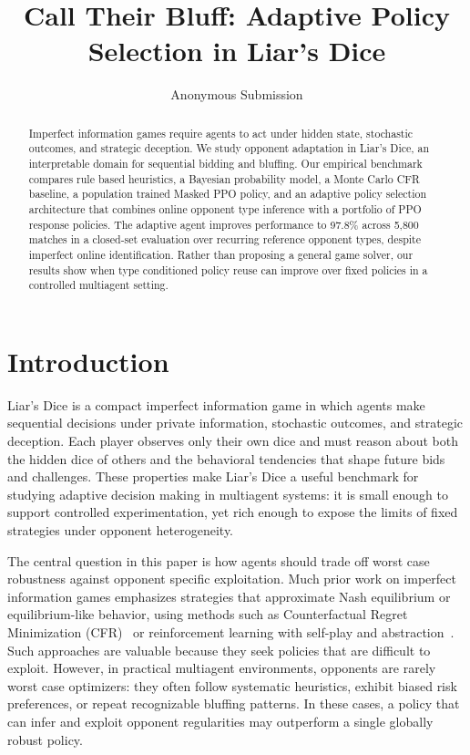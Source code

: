 \documentclass[letterpaper]{article} %
\title{Call Their Bluff: Adaptive Policy Selection in Liar’s Dice}
\author{Anonymous Submission}
\begin{document}
\maketitle



\begin{abstract}
Imperfect information games require agents to act under hidden state, stochastic outcomes, and strategic deception. We study opponent adaptation in Liar's Dice, an interpretable domain for sequential bidding and bluffing. Our empirical benchmark compares rule based heuristics, a Bayesian probability model, a Monte Carlo CFR baseline, a population trained Masked PPO policy, and an adaptive policy selection architecture that combines online opponent type inference with a portfolio of PPO response policies. The adaptive agent improves performance to 97.8\% across 5,800 matches in a closed-set evaluation over recurring reference opponent types, despite imperfect online identification. Rather than proposing a general game solver, our results show when type conditioned policy reuse can improve over fixed policies in a controlled multiagent setting.
\end{abstract}




\section{Introduction}

Liar’s Dice is a compact imperfect information game in which agents make sequential decisions under private information, stochastic outcomes, and strategic deception. Each player observes only their own dice and must reason about both the hidden dice of others and the behavioral tendencies that shape future bids and challenges. These properties make Liar’s Dice a useful benchmark for studying adaptive decision making in multiagent systems: it is small enough to support controlled experimentation, yet rich enough to expose the limits of fixed strategies under opponent heterogeneity.

The central question in this paper is how agents should trade off worst case robustness against opponent specific exploitation. Much prior work on imperfect information games emphasizes strategies that approximate Nash equilibrium or equilibrium-like behavior, using methods such as Counterfactual Regret Minimization (CFR)~\cite{cfr} or reinforcement learning with self-play and abstraction~\cite{heinrich2016deep}. Such approaches are valuable because they seek policies that are difficult to exploit. However, in practical multiagent environments, opponents are rarely worst case optimizers: they often follow systematic heuristics, exhibit biased risk preferences, or repeat recognizable bluffing patterns. In these cases, a policy that can infer and exploit opponent regularities may outperform a single globally robust policy.
\end{document}

